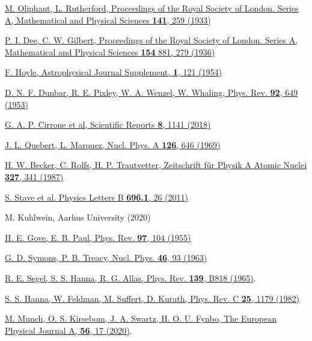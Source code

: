 \begin{thebibliography}{}
\hypersetup{urlcolor=black}

\href{https://www.jstor.org/stable/96218}{M. Oliphant, L. Rutherford, Proceedings of the Royal Society of London. Series A, Mathematical and Physical Sciences \textbf{141}, 259 (1933)}

\href{https://www.jstor.org/stable/96484}{P. I. Dee, C. W. Gilbert, Proceedings of the Royal Society of London. Series A, Mathematical and Physical Sciences \textbf{154} 881, 279 (1936)}

\href{https://doi.org/10.1086\%2F190005}{F. Hoyle, Astrophysical Journal Supplement, \textbf{1}, 121 (1954)}

\href{https://doi.org/10.1103/PhysRev.92.649}{D. N. F. Dunbar, R. E. Pixley, W. A. Wenzel, W. Whaling, Phys. Rev. \textbf{92}, 649 (1953)}

\href{https://doi.org/10.1038/s41598-018-19258-5}{G. A. P. Cirrone et al, Scientific Reports \textbf{8}, 1141 (2018)}

\href{https://doi.org/10.1016/0375-9474(69)90854-9}{J. L. Quebert, L. Marquez, Nucl. Phys. A \textbf{126}, 646 (1969)}

\href{https://doi.org/10.1007/BF01284459}{H. W. Becker, C. Rolfs, H. P. Trautvetter, Zeitschrift für Physik A Atomic Nuclei \textbf{327}, 341 (1987)}

\href{https://doi.org/10.1016/j.physletb.2010.12.015}{S. Stave et al. Physics Letters B \textbf{696.1}, 26 (2011)}

M. Kuhlwein, Aarhus University (2020)

\href{https://doi.org/10.1103/PhysRev.97.104}{H. E. Gove, E. B. Paul, Phys. Rev. \textbf{97}, 104 (1955)}

\href{https://doi.org/10.1016/0029-5582(63)90567-4}{G. D. Symons, P. B. Treacy, Nucl. Phys. \textbf{46}, 93 (1963)}

\href{https://doi.org/10.1103/PhysRev.139.B818}{R. E. Segel, S. S. Hanna, R. G. Allas, Phys. Rev. \textbf{139}, B818 (1965)}. 

\href{https://doi.org/10.1103/PhysRevC.25.1179}{S. S. Hanna, W. Feldman, M. Suffert, D. Kurath, Phys. Rev. C \textbf{25}, 1179 (1982)}

\href{https://doi.org/10.1140/epja/s10050-019-00016-8}{M. Munch, O. S. Kirsebom, J. A. Swartz, H. O. U. Fynbo, The European Physical Journal A, \textbf{56}, 17 (2020)}. 


\end{thebibliography}
